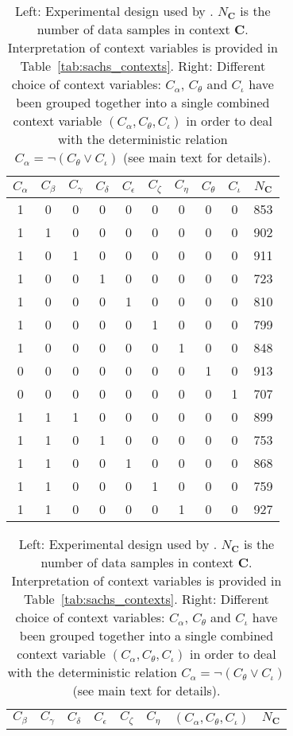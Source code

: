 \documentclass[twoside,11pt]{article}
\newcommand\B[1]{\bm{#1}}
\newcommand{\Joris}[1]{{\color{blue}#1}}
\begin{document}
\begin{table}[t!]
  \caption{Left: Experimental design used by \citet{SPP05}. $N_{\B{C}}$ is the number of data samples in context $\B{C}$. Interpretation of context variables is provided in Table~\ref{tab:sachs_contexts}. Right: Different choice of context variables: $C_\alpha$, $C_\theta$ and $C_\iota$ have been grouped together into a single combined context variable $(C_\alpha,C_\theta,C_\iota)$ in order to deal with the deterministic relation $C_\alpha = \lnot (C_\theta \lor C_\iota)$ (see main text for details). %
\label{tab:sachs_experimental_design}}
  \centering
\tiny
  \begin{tabular}{|ccccccccc|c|}
\hline
  $C_\alpha$ & $C_\beta$ & $C_\gamma$ & $C_\delta$ & $C_\epsilon$ & $C_\zeta$ & $C_\eta$ & $C_\theta$ & $C_\iota$ & $N_{\B{C}}$ \\
\hline
  1 & 0 & 0 & 0 & 0 & 0 & 0 & 0 & 0 & 853 \\
  1 & 1 & 0 & 0 & 0 & 0 & 0 & 0 & 0 & 902 \\
  1 & 0 & 1 & 0 & 0 & 0 & 0 & 0 & 0 & 911 \\
  1 & 0 & 0 & 1 & 0 & 0 & 0 & 0 & 0 & 723 \\
  1 & 0 & 0 & 0 & 1 & 0 & 0 & 0 & 0 & 810 \\
  1 & 0 & 0 & 0 & 0 & 1 & 0 & 0 & 0 & 799 \\
  1 & 0 & 0 & 0 & 0 & 0 & 1 & 0 & 0 & 848 \\
  0 & 0 & 0 & 0 & 0 & 0 & 0 & 1 & 0 & 913 \\
  0 & 0 & 0 & 0 & 0 & 0 & 0 & 0 & 1 & 707 \\
  1 & 1 & 1 & 0 & 0 & 0 & 0 & 0 & 0 & 899 \\
  1 & 1 & 0 & 1 & 0 & 0 & 0 & 0 & 0 & 753 \\
  1 & 1 & 0 & 0 & 1 & 0 & 0 & 0 & 0 & 868 \\
  1 & 1 & 0 & 0 & 0 & 1 & 0 & 0 & 0 & 759 \\
  1 & 1 & 0 & 0 & 0 & 0 & 1 & 0 & 0 & 927 \\
\hline
\end{tabular}\hfill
\begin{tabular}{|ccccccc|c|}
\hline
  $C_\beta$ & $C_\gamma$ & $C_\delta$ & $C_\epsilon$ & $C_\zeta$ & $C_\eta$ & $(C_\alpha,C_\theta,C_\iota)$ & $N_{\B{C}}$ \\

\end{tabular}
\end{table}
\end{document}
